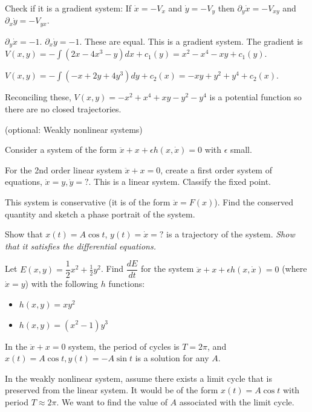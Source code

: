 \documentclass[12pt,letterpaper,answers]{exam}
\begin{document}
\begin{questions}
\begin{parts}
\begin{solution}
Check if it is a gradient system: If $\dot x = -V_x$ and $\dot y = -V_y$ then $\partial_y \dot x = -V_{xy}$ and $\partial_x \dot y = -V_{yx}$.

$\partial_y \dot x = -1$.  $\partial_x \dot y = -1$.  These are equal.  This is a gradient system.  The gradient is
$V(x,y) = -\int (2x-4x^3-y)dx + c_1(y) = x^2 - x^4 -xy + c_1(y)$.

$V(x,y) = -\int (-x + 2y + 4y^3)dy + c_2(x) = -xy + y^2 + y^4 + c_2(x)$.

Reconciling these, $V(x,y) = -x^2 + x^4 + xy - y^2 - y^4$ is a potential function so there are no closed trajectories.
    
    \end{solution}
\end{parts}



\question (optional: Weakly nonlinear systems)

Consider a system of the form $\ddot x + x + \epsilon h(x,\dot x) = 0$ with $\epsilon$ small.

\begin{parts}
\item For the 2nd order linear system $\ddot x + x = 0$, create a first order system of equations, $\dot x = y, \dot y = ?$.  This is a linear system.  Classify the fixed point.
\item This system is conservative (it is of the form $\ddot x = F(x)$).  Find the conserved quantity and sketch a phase portrait of the system.
\item Show that $x(t) = A\cos t$, $y(t) = \dot x = ?$ is a trajectory of the system.  \emph{Show that it satisfies the differential equations.}
\item Let $E(x,y) = \dfrac{1}{2}x^2 + \frac{1}{2}y^2$.  Find $\dfrac{dE}{dt}$ for the system $\ddot x + x + \epsilon h(x,\dot x) = 0$ (where $\dot x = y$) with the following $h$ functions:
\begin{itemize}
    \item $h(x,y) = xy^2$
    \item $h(x,y) = (x^2-1)y^3$
\end{itemize}
\item In the $\ddot x + x = 0$ system, the period of cycles is $T = 2\pi$, and $x(t) = A\cos t, y(t) = -A\sin t$ is a solution for any $A$.  

In the weakly nonlinear system, assume there exists a limit cycle that is preserved from the linear system.  It would be of the form $x(t) = A\cos t$ with period $T\approx 2\pi$.  We want to find the value of $A$ associated with the limit cycle.  


\end{parts}
\end{questions}
\end{document}
